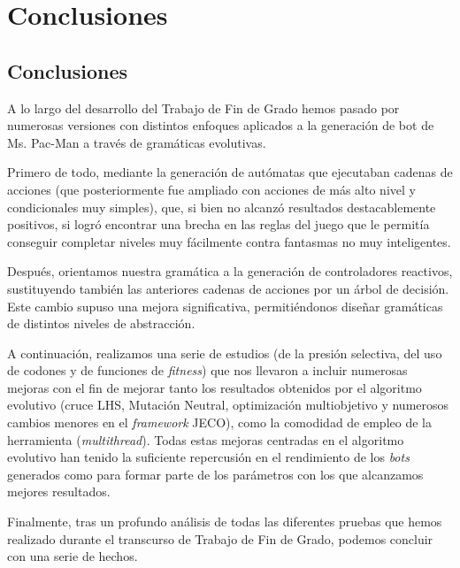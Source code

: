 \chapter{Conclusiones} \label{cap:conclusiones}

\section{Conclusiones}
A lo largo del desarrollo del Trabajo de Fin de Grado hemos pasado por numerosas versiones con distintos enfoques aplicados a la generación de bot de Ms. Pac-Man a través de gramáticas evolutivas. 
 
Primero de todo, mediante la generación de autómatas que ejecutaban cadenas de acciones (que posteriormente fue ampliado con acciones de más alto nivel y condicionales muy simples), que, si bien no alcanzó resultados destacablemente positivos, si logró encontrar una brecha en las reglas del juego que le permitía conseguir completar niveles muy fácilmente contra fantasmas no muy inteligentes.
 
Después, orientamos nuestra gramática a la generación de controladores reactivos, sustituyendo también las anteriores cadenas de acciones por un árbol de decisión. Este cambio supuso una mejora significativa, permitiéndonos diseñar gramáticas de distintos niveles de abstracción.
 
A continuación, realizamos una serie de estudios (de la presión selectiva, del uso de codones y de funciones de \textit{fitness}) que nos llevaron a incluir numerosas mejoras con el fin de mejorar tanto los resultados obtenidos por el algoritmo evolutivo (cruce LHS, Mutación Neutral, optimización multiobjetivo y numerosos cambios menores en el \textit{framework} JECO), como la comodidad de empleo de la herramienta (\textit{multithread}). Todas estas mejoras centradas en el algoritmo evolutivo han tenido la suficiente repercusión en el rendimiento de los \textit{bots} generados como para formar parte de los parámetros con los que alcanzamos mejores resultados.
 
Finalmente, tras un profundo análisis de todas las diferentes pruebas que hemos realizado durante el transcurso de Trabajo de Fin de Grado, podemos concluir con una serie de hechos. 
 
